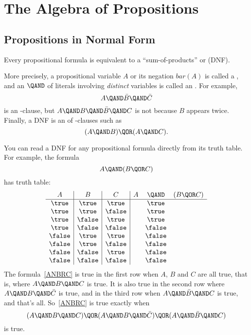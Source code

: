 \section{The Algebra of Propositions}\label{prop_algebra_sec}

\subsection{Propositions in Normal Form}\label{normal_form_sec}
Every propositional formula is equivalent to a ``sum-of-products'' or
 (DNF). 

More precisely, a propositional variable $A$ or its negation $bar(A)$
is called a , and an $\QAND$ of literals involving
\emph{distinct} variables is called an .  For
example,
\[
A \QAND \bar{B} \QAND \bar{C}
\]
is an \QAND-clause, but $A \QAND B \QAND \bar{B} \QAND C$ is not
because $B$ appears twice.  Finally, a DNF is an \QOR of \QAND-clauses such as
\begin{equation}\label{ANBOANC}
(A \QAND B) \QOR (A \QAND C).
\end{equation}

You can read a DNF for any propositional formula directly
from its truth table.  For example, the formula
\begin{equation}\label{ANBRC}
A \QAND (B \QOR C)
\end{equation}
has truth table:
\[\begin{array}{c|c|c|ccc}
A      & B      & C       & A & \QAND & (B \QOR C)\label{ANBRCTT}\\
\hline \true  & \true  & \true   &   &  \true\\
\true  & \true  & \false  &   &  \true\\
\true  & \false & \true   &   &  \true\\
\true  & \false & \false  &   &  \false\\
\false & \true  & \true   &   &  \false\\
\false & \true  & \false  &   &  \false\\
\false & \false & \true   &   &  \false\\
\false & \false & \false  &   &  \false
\end{array}\]
The formula~\eqref{ANBRC} is true in the first row when $A$, $B$ and
$C$ are all true, that is, where $A \QAND B \QAND C$ is true.  It is
also true in the second row where $A \QAND B \QAND \bar{C}$ is true,
and in the third row when $A \QAND \bar{B} \QAND C$ is true, and
that's all.  So~\eqref{ANBRC} is true exactly when
\begin{equation}\label{ABCDNF}
(A \QAND B \QAND C) \QOR (A \QAND B \QAND \bar{C}) \QOR
  (A \QAND \bar{B} \QAND C)
\end{equation}
is true.

